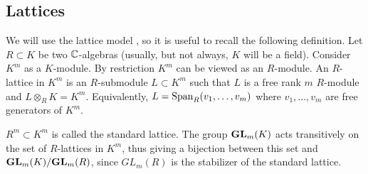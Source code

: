 \documentclass[draft]{article}
\begin{document}
\subsection{Lattices}
\label{ss:lat}
We will use the lattice model , so it is useful to recall the following definition. Let $ R \subset K$ be two $\mathbb C$-algebras (usually, but not always, $K$ will be a field). 
Consider $ K^m $ as a $K$-module. By restriction $ K^m$ can be viewed as an $R$-module.  An $R$-lattice in $K^m$ 
is an $R$-submodule $ L \subset K^m$ such that $ L $ is a free rank $ m $ $R$-module and $ L \otimes_R K = K^m $.  Equivalently, $ L = \operatorname{Span}_R(v_1, \dots, v_m)$ where $v_1, \dots, v_m$ are free generators of $K^m$. 
% 
\begin{comment}
\jcom{Maybe need that both $K$ and $R$ are integral domains and have the same field of fractions?} 
\acom{Roger has proved that what is written is ok.}
\rcom{Here's my argument: If $L \subset K^m$ is a free rank $m$ $R$-module and $L \otimes K = K^m$, then it's clear we that $L$ is generated by $m$ generators $v_1,\dots,v_m$ over $R$. Since $L\otimes K = K^m$, these also generate $K^m$ over $K$. Then we have a surjective map $K^m \twoheadrightarrow K^m$ given by sending a basis of $K^m$ to the generators $v_1,\dots,v_m$. Since any surjective endomorphism of finite $K$-modules is injective, the $v_1,\dots,v_m$ form a basis. I think the only thing that is needed is that the rings are commutative.}
\jcom{Great.}
\end{comment} 

$ R^m \subset K^m $ is called the standard lattice. 
The group ${\mathbf{GL}}_m(K) $ acts transitively on the set of $R$-lattices in $K^m$, thus giving a bijection between 
this set and ${\mathbf{GL}}_m(K)/{\mathbf{GL}}_m(R)$, since $ GL_m(R) $ is the stabilizer of the standard lattice. 
\end{document}
